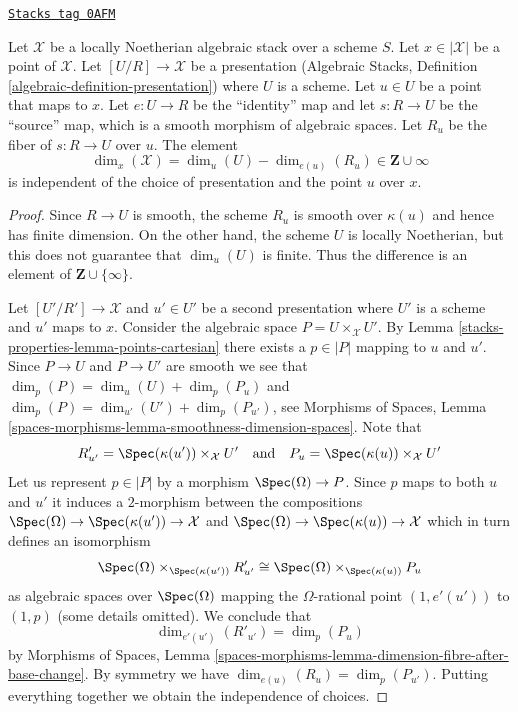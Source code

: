 \begin{lemma}
\label{stacks-properties-lemma-dimension-at-point-well-defined}
\href{https://stacks.math.columbia.edu/tag/0AFM}{\texttt{Stacks tag 0AFM}}

Let $\mathcal{X}$ be a locally Noetherian algebraic stack over a scheme $S$.
Let $x \in |\mathcal{X}|$ be a point of $\mathcal{X}$.
Let $[U/R] \to \mathcal{X}$ be a presentation
(Algebraic Stacks, Definition \ref{algebraic-definition-presentation})
where $U$ is a scheme. Let $u \in U$ be a point that maps to $x$.
Let $e : U \to R$ be the ``identity'' map and let $s : R \to U$ be the
``source'' map, which is a smooth morphism of algebraic spaces. Let $R_u$
be the fiber of $s : R \to U$ over $u$. The element
$$
\dim_x(\mathcal{X}) = \dim_u(U) - \dim_{e(u)}(R_u) \in \mathbf{Z} \cup \infty
$$
is independent of the choice of presentation and the point $u$ over $x$.
\end{lemma}

\begin{proof}
Since $R \to U$ is smooth, the scheme $R_u$ is smooth over $\kappa(u)$
and hence has finite dimension. On the other hand, the scheme $U$
is locally Noetherian, but this does not guarantee that
$\dim_u(U)$ is finite. Thus the difference is an element of
$\mathbf{Z} \cup \{\infty\}$.

\medskip\noindent
Let $[U'/R'] \to \mathcal{X}$ and $u' \in U'$ be a second presentation
where $U'$ is a scheme and $u'$ maps to $x$. Consider the algebraic
space $P = U \times_\mathcal{X} U'$. By
Lemma \ref{stacks-properties-lemma-points-cartesian} there exists a $p \in |P|$ mapping to
$u$ and $u'$. Since $P \to U$ and $P \to U'$ are smooth we see that
$\dim_p(P) = \dim_u(U) + \dim_p(P_u)$ and
$\dim_p(P) = \dim_{u'}(U') + \dim_p(P_{u'})$, see
Morphisms of Spaces, Lemma
\ref{spaces-morphisms-lemma-smoothness-dimension-spaces}.
Note that
$$
R'_{u'} = \Spec(\kappa(u')) \times_\mathcal{X} U'
\quad\text{and}\quad
P_u = \Spec(\kappa(u)) \times_\mathcal{X} U'
$$
Let us represent $p \in |P|$ by a morphism $\Spec(\Omega) \to P$.
Since $p$ maps to both $u$ and $u'$ it induces a $2$-morphism
between the compositions
$\Spec(\Omega) \to \Spec(\kappa(u')) \to \mathcal{X}$ and
$\Spec(\Omega) \to \Spec(\kappa(u)) \to \mathcal{X}$
which in turn defines an isomorphism
$$
\Spec(\Omega) \times_{\Spec(\kappa(u'))} R'_{u'}
\cong
\Spec(\Omega) \times_{\Spec(\kappa(u))} P_u
$$
as algebraic spaces over $\Spec(\Omega)$ mapping the $\Omega$-rational
point $(1, e'(u'))$ to $(1, p)$ (some details omitted). We conclude that
$$
\dim_{e'(u')}(R'_{u'}) = \dim_p(P_u)
$$
by Morphisms of Spaces, Lemma
\ref{spaces-morphisms-lemma-dimension-fibre-after-base-change}.
By symmetry we have
$\dim_{e(u)}(R_u) = \dim_p(P_{u'})$.
Putting everything together we obtain the independence of choices.
\end{proof}

